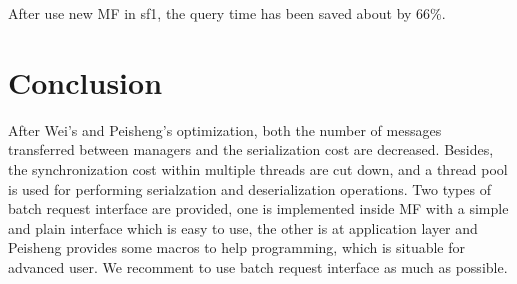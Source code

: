 \documentclass[a4paper,10pt]{article}
\begin{document}
After use new MF in sf1, the query time has been saved about by 66\%.

\section{Conclusion}
After Wei's and Peisheng's optimization, both the number of messages transferred between managers and the serialization cost are decreased.
Besides, the synchronization cost within multiple threads are cut down, and a thread pool is used for performing serialzation and deserialization operations.
Two types of batch request interface are provided, one is implemented inside MF with a simple and plain interface which is easy to use,
the other is at application layer and Peisheng provides some macros to help programming, which is situable for advanced user.
We recomment to use batch request interface as much as possible.

\printindex
\end{document}
